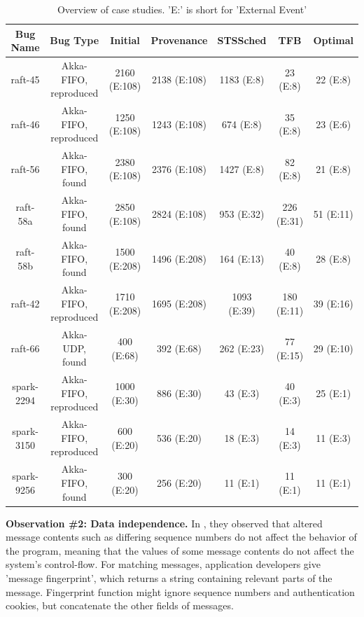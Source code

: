 \begin{table}[t]
\caption{Overview of case studies. 'E:' is short for 'External Event'}
\label{tab:table1}
\centering
\begin{tabular}{|c|c|c|c|c|c|c|}
\hline
Bug Name & Bug Type & Initial & Provenance & STSSched & TFB & Optimal\\
\hline
\hline
raft-45 &	Akka-FIFO, reproduced &	2160 (E:108)&	2138 (E:108)&	1183 (E:8) & 23 (E:8) & 22 (E:8)\\
\hline

raft-46 &	Akka-FIFO, reproduced &	1250 (E:108)&	1243 (E:108)&	674 (E:8) & 35 (E:8) & 23 (E:6)\\
\hline

raft-56 &	Akka-FIFO, found &	2380 (E:108)&	2376 (E:108)&	1427 (E:8) & 82 (E:8) & 21 (E:8)\\
\hline

raft-58a &	Akka-FIFO, found &	2850 (E:108)&	2824 (E:108)&	953 (E:32) & 226 (E:31) & 51 (E:11)\\
\hline

raft-58b &	Akka-FIFO, found &	1500 (E:208)&	1496 (E:208)&	164 (E:13) & 40 (E:8) & 28 (E:8)\\
\hline

raft-42 &	Akka-FIFO, reproduced &	1710 (E:208)&	1695 (E:208)&	1093 (E:39) & 180 (E:11) & 39 (E:16)\\
\hline

raft-66 &	Akka-UDP, found &	400 (E:68)&	392 (E:68)&	262 (E:23) & 77 (E:15) & 29 (E:10)\\
\hline

spark-2294 &	Akka-FIFO, reproduced &	1000 (E:30)&	886 (E:30)&	43 (E:3) & 40 (E:3) & 25 (E:1)\\
\hline

spark-3150 &	Akka-FIFO, reproduced &	600 (E:20)&	536 (E:20)&	18 (E:3) & 14 (E:3) & 11 (E:3)\\
\hline

spark-9256 &	Akka-FIFO, found &	300 (E:20)&	256 (E:20)&	11 (E:1) & 11 (E:1) & 11 (E:1)\\
\hline

\end{tabular}
\end{table}

\textbf{Observation \#2: Data independence.} In \cite{9}, they observed that altered message contents such as differing sequence numbers do not affect the behavior of the program, meaning that the values of some message contents do not affect the system's control-flow. For matching messages, application developers give 'message fingerprint', which returns a string containing relevant parts of the message.  Fingerprint function might ignore sequence numbers and authentication cookies, but concatenate the other fields of messages.

